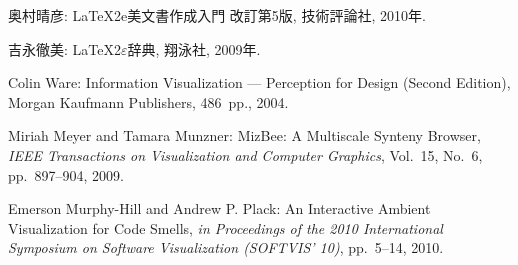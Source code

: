 \documentclass[a4paper,11pt]{jreport}
\begin{document}
\begin{thebibliography}{99}
奥村晴彦: 
LaTeX2e美文書作成入門 改訂第5版, 
技術評論社, 2010年.	%

吉永徹美: 
LaTeX2$\varepsilon$辞典, 
翔泳社, 2009年.		%

Colin Ware:
Information Visualization --- Perception for Design (Second Edition), 
Morgan Kaufmann Publishers, 486~pp., 2004.

Miriah Meyer and Tamara Munzner:
MizBee: A Multiscale Synteny Browser, 
{\it IEEE Transactions on Visualization and Computer Graphics},
Vol.~15, No.~6, pp.~897--904, 2009.

Emerson Murphy-Hill and Andrew P. Plack: 
An Interactive Ambient Visualization for Code Smells, 
{\it in Proceedings of the 2010 International Symposium on Software Visualization (SOFTVIS' 10)},
pp.~5--14, 2010.

\end{thebibliography}
\end{document}
